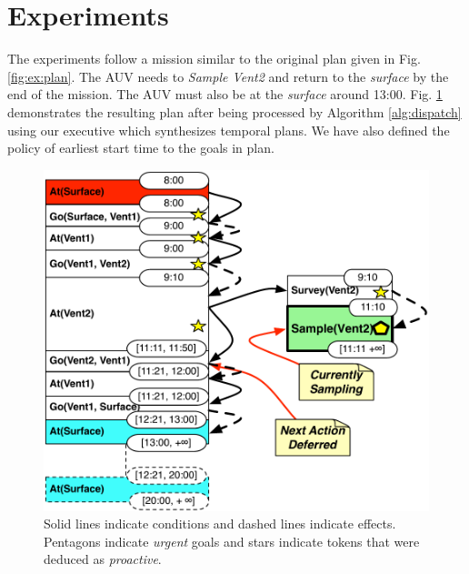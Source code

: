 \section{Experiments}
\label{sec:exp}

The experiments follow a mission similar to the original plan given in
Fig. \ref{fig:ex:plan}. The AUV needs to {\em Sample Vent2} and return
to the {\em surface} by the end of the mission. The AUV must also be
at the {\em surface} around
13:00. %
Fig. \ref{fig:ex:mixed1} demonstrates the resulting plan after being
processed by Algorithm \ref{alg:dispatch} using our executive \rx
which synthesizes temporal plans. We have also defined the policy
of earliest start time to the goals in plan.

\begin{figure}[!htbp]
  \centering
  \includegraphics[width=0.9\columnwidth]{figs/example_MixedInitial}
  \vskip-2mm
  \caption{\small Solid lines indicate conditions and dashed lines
    indicate effects. Pentagons indicate {\em urgent} goals and stars
    indicate tokens that were deduced as {\em proactive}.}
  \label{fig:ex:mixed1}
  \vskip-3mm
\end{figure}



